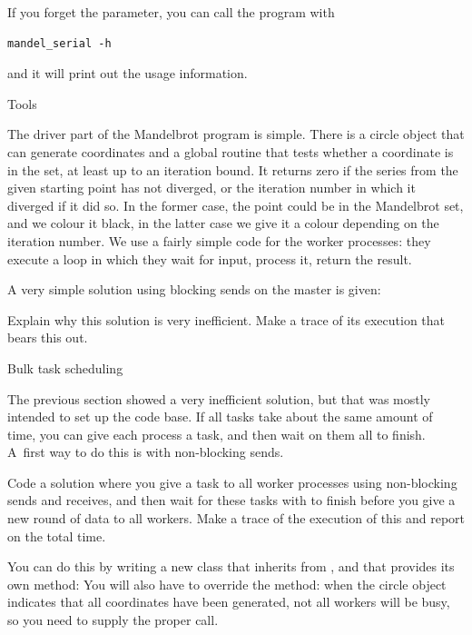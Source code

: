 If you forget the parameter, you can call the program with
\begin{verbatim}
mandel_serial -h
\end{verbatim}
and it will print out the usage information.

 {Tools}

The driver part of the Mandelbrot program is simple. There is a 
circle object that can generate coordinates
and a global routine that tests whether a coordinate is in the set,
at least up to an iteration bound. It returns zero if the 
series from the given starting point has not diverged,
or the iteration number in which it diverged if it did so.
In the former case,  the point could be in the Mandelbrot set, 
and we colour it black, in the latter case we give it a colour
depending on the iteration number.
We use a fairly simple code for the worker processes: they 
execute a loop in which they wait 
for input, process it, return the result.

A very simple solution using blocking sends on the master is given:

\begin{exercise}
  Explain why this solution is very inefficient. Make a trace of its
  execution that bears this out.
\end{exercise}

 {Bulk task scheduling}
\label{proj:mandel-bulk}

The previous section showed a very inefficient solution, but that was mostly
intended to set up the code base. If all tasks take about the same amount of time,
you can give each process a task, and then wait on them all to finish. A~first way
to do this is with non-blocking sends.

\begin{exercise}
  Code a  solution where you give a task to all worker processes
  using non-blocking sends and receives, and then wait for these tasks
  with 
  to finish before you give a new round of data to all workers.
  Make a trace of the execution of this and report on the total time.

  You can do this by writing a new class that inherits from ,
  and that provides its own  method:
  You will also have to override the  method: when the circle 
  object indicates that all coordinates have been generated, not all
  workers will be busy, so you need to supply the proper 
  call.
\end{exercise}

